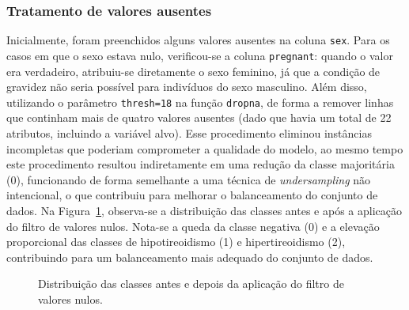 \documentclass[11pt]{article}
\begin{document}
\subsubsection{Tratamento de valores ausentes}
Inicialmente, foram preenchidos alguns valores ausentes na coluna \texttt{sex}. Para os casos em que o sexo estava nulo, verificou-se a coluna \texttt{pregnant}: quando o valor era verdadeiro, atribuiu-se diretamente o sexo feminino, já que a condição de gravidez não seria possível para indivíduos do sexo masculino.
Além disso, utilizando o parâmetro \texttt{thresh=18} na função \texttt{dropna}, de forma a remover linhas que continham mais de quatro valores ausentes (dado que havia um total de 22 atributos, incluindo a variável alvo). Esse procedimento eliminou instâncias incompletas que poderiam comprometer a qualidade do modelo, ao mesmo tempo este procedimento resultou indiretamente em uma redução da classe majoritária (0), funcionando de forma semelhante a uma técnica de \textit{undersampling} não intencional, o que contribuiu para melhorar o balanceamento do conjunto de dados.
Na Figura~\ref{fig:pie-before-after}, observa-se a distribuição das classes antes e após a aplicação do filtro de valores nulos. Nota-se a queda da classe negativa (0) e a elevação proporcional das classes de hipotireoidismo (1) e hipertireoidismo (2), contribuindo para um balanceamento mais adequado do conjunto de dados.

\begin{figure}[H]
    \centering
    \hfill
    \caption{Distribuição das classes antes e depois da aplicação do filtro de valores nulos.}
    \label{fig:pie-before-after}
\end{figure}
\end{document}
